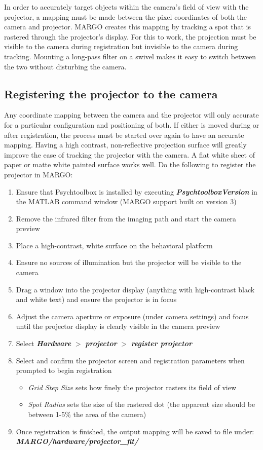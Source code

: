 \documentclass[11pt]{article}
\begin{document}
In order to accurately target objects within the camera's field of view with the projector, a mapping must be made between the pixel coordinates of both the camera and projector. MARGO creates this mapping by tracking a spot that is rastered through the projector's display. For this to work, the projection must be visible to the camera during registration but invisible to the camera during tracking. Mounting a long-pass filter on a swivel makes it easy to switch between the two without disturbing the camera.

\subsection{Registering the projector to the camera}

Any coordinate mapping between the camera and the projector will only accurate for a particular configuration and positioning of both. If either is moved during or after registration, the process must be started over again to have an accurate mapping. Having a high contrast, non-reflective projection surface will greatly improve the ease of tracking the projector with the camera. A flat white sheet of paper or matte white painted surface works well. Do the following to register the projector in MARGO:

\begin{enumerate}
	\item Ensure that Psychtoolbox is installed by executing \textbf{\textit{PsychtoolboxVersion}} in the MATLAB command window (MARGO support built on version 3)
	\item Remove the infrared filter from the imaging path and start the camera preview
	\item Place a high-contrast, white surface on the behavioral platform
	\item Ensure no sources of illumination but the projector will be visible to the camera 
	\item Drag a window into the projector display (anything with high-contrast black and white text) and ensure the projector is in focus
	\item Adjust the camera aperture or exposure (under camera settings) and focus until the projector display is clearly visible in the camera preview
	\item Select \textbf{\textit{Hardware}} $>$ \textbf{\textit{projector}} $>$ \textbf{\textit{register projector}}
	\item Select and confirm the projector screen and registration parameters when prompted to begin registration
		\begin{itemize}
			\item \textit{Grid Step Size} sets how finely the projector rasters its field of view
			\item \textit{Spot Radius} sets the size of the rastered dot (the apparent size should be between 1-5\% the area of the camera)
		\end{itemize}
	\item Once registration is finished, the output mapping will be saved to file under: \newline \textbf{\textit{\texttildelow MARGO/hardware/projector\_fit/}}
\end{enumerate}
\end{document}
